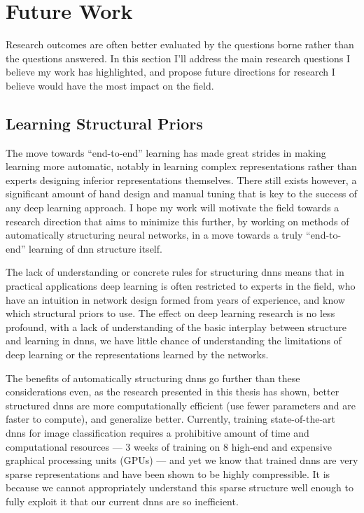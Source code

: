 \documentclass[thesis]{subfiles}
\begin{document}

\chapter{Future Work}  %
\label{futurework}


Research outcomes are often better evaluated by the questions borne rather than the questions answered. In this section I'll address the main research questions I believe my work has highlighted, and propose future directions for research I believe would have the most impact on the field.

\section{Learning Structural Priors}
The move towards ``end-to-end'' learning has made great strides in making learning more automatic, notably in learning complex representations rather than experts designing inferior representations themselves. There still exists however, a significant amount of hand design and manual tuning that is key to the success of any deep learning approach. I hope my work will motivate the field towards a research direction that aims to minimize this further, by working on methods of automatically structuring neural networks, in a move towards a truly ``end-to-end'' learning of \gls{dnn} structure itself.

The lack of understanding or concrete rules for structuring \glspl{dnn} means that in practical applications deep learning is often restricted to experts in the field, who have an intuition in network design formed from years of experience, and know which structural priors to use. The effect on deep learning research is no less profound, with a lack of understanding of the basic interplay between structure and learning in \glspl{dnn}, we have little chance of understanding the limitations of deep learning or the representations learned by the networks. 

The benefits of automatically structuring \glspl{dnn} go further than these considerations even, as the research presented in this thesis has shown, better structured \glspl{dnn} are more computationally efficient (use fewer parameters and are faster to compute), and generalize better. Currently, training state-of-the-art \glspl{dnn} for image classification requires a prohibitive amount of time and computational resources --- 3 weeks of training on 8 high-end and expensive graphical processing units (GPUs) --- and yet we know that trained \glspl{dnn} are very sparse representations and have been shown to be highly compressible. It is because we cannot appropriately understand this sparse structure well enough to fully exploit it that our current \glspl{dnn} are so inefficient.
\end{document}
